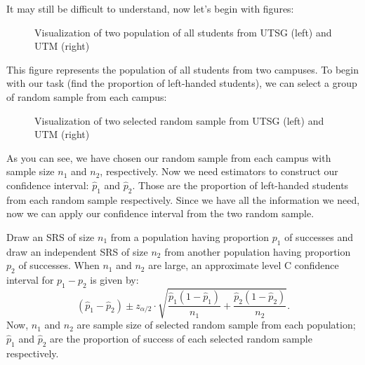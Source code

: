 It may still be difficult to understand, now let's begin with figures:

\begin{center}
\begin{figure}[h!]
\centering
{}
\caption{Visualization of two population of all students from UTSG (left) and UTM (right)}
\end{figure}
\end{center}

This figure represents the population of all students from two campuses. To begin with our task (find the proportion of left-handed students), we can select a group of random sample from each campus:

\begin{center}
\begin{figure}[h!]
\centering
{}
\caption{Visualization of two selected random sample from UTSG (left) and UTM (right)}
\end{figure}
\end{center}

As you can see, we have chosen our random sample from each campus with sample size $n_1$ and $n_2$, respectively. Now we need estimators to construct our confidence interval: $\hat{p}_1$ and $\hat{p}_2$. Those are the proportion of left-handed students from each random sample respectively. Since we have all the information we need, now we can apply our confidence interval from the two random sample.

\begin{definition}
Draw an SRS of size $n_1$ from a population having proportion $p_1$ of successes and draw an independent SRS of size $n_2$ from another population having proportion $p_2$ of successes. When $n_1$ and $n_2$ are large, an approximate level C confidence interval for $p_1 - p_2$ is given by: \[ (\hat{p}_1 - \hat{p}_2)  \pm z_{\alpha/2} \cdot \sqrt{ \frac{\hat{p}_1(1-\hat{p}_1)}{n_1} + \frac{\hat{p}_2(1-\hat{p}_2)}{n_2}}.\]
Now, $n_1$ and $n_2$ are sample size of selected random sample from each population; $\hat{p}_1$ and $\hat{p}_2$ are the proportion of success of each selected random sample respectively.
\end{definition}


